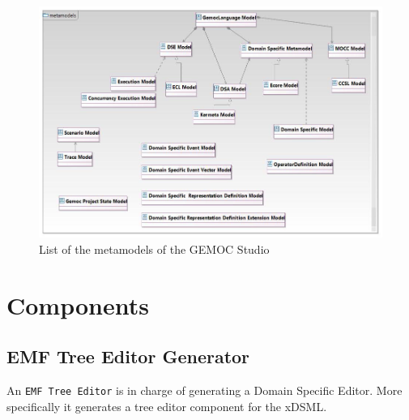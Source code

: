 \documentclass{gemoc} %
\begin{document}
\begin{figure}[htp]
	\begin{center}
	\includegraphics*[trim=0.0cm 0.0cm 0cm 0.0cm, clip=true, width=1.0\linewidth]{../images/Gemoc Metamodels Class Diagram.jpg}
	\caption{List of the metamodels of the GEMOC Studio}
	\label{fig:MetamodelList}
	\end{center}
\end{figure}


\section{Components}

\subsection{EMF Tree Editor Generator}
\label{sec:EMF_Tree_Editor_Generator}

An \texttt{EMF Tree Editor} is in charge of generating a Domain Specific Editor. More specifically it generates a tree editor component for the xDSML. 
\end{document}
